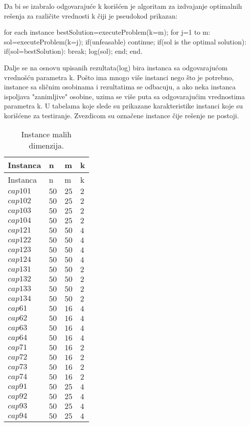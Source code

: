 \documentclass[a4paper]{article}
\begin{document}
Da bi se izabralo odgovarajuće k korišćen je algoritam za izdvajanje optimalnih rešenja za različite vrednosti k čiji je pseudokod prikazan:
\begin{algorithm}
for each instance
	bestSolution=executeProblem(k=m);
	for j=1 to m:
		sol=executeProblem(k=j);
		if(unfeasable)
			continue;
		if(sol is the optimal solution):
			if(sol=bestSolution):
				break;
			log(sol);
	end;
end.
\end{algorithm}

Dalje se na osnovu upisanih rezultata(log) bira instanca sa odgovarajućom vrednošću parametra k. Pošto ima mnogo više instanci nego što je potrebno, instance sa sličnim osobinama i rezultatima se odbacuju, a ako neka instanca ispoljava "zanimljive" osobine, uzima se više puta sa odgovarajućim vrednostima parametra k. U tabelama koje slede su prikazane karakteristike instanci koje su korišćene za testiranje. Zvezdicom su označene instance čije rešenje ne postoji.


\begin{longtabu} to 1\textwidth{ X[2] | X  X  X }\caption{Instance malih dimenzija.\label{instancetable}}\\ Instanca & n & m &k \\\hline\endfirsthead\endfoot Instanca & n & m &k \\\hline\endhead\hline\endlastfoot $cap101$& $50$ & $25$ & $2$\\ 
$cap102$& $50$ & $25$ & $2$\\ 
$cap103$& $50$ & $25$ & $2$\\ 
$cap104$& $50$ & $25$ & $2$\\ 
$cap121$& $50$ & $50$ & $4$\\ 
$cap122$& $50$ & $50$ & $4$\\ 
$cap123$& $50$ & $50$ & $4$\\ 
$cap124$& $50$ & $50$ & $4$\\ 
$cap131$& $50$ & $50$ & $2$\\ 
$cap132$& $50$ & $50$ & $2$\\ 
$cap133$& $50$ & $50$ & $2$\\ 
$cap134$& $50$ & $50$ & $2$\\ 
$cap61$& $50$ & $16$ & $4$\\ 
$cap62$& $50$ & $16$ & $4$\\ 
$cap63$& $50$ & $16$ & $4$\\ 
$cap64$& $50$ & $16$ & $4$\\ 
$cap71$& $50$ & $16$ & $2$\\ 
$cap72$& $50$ & $16$ & $2$\\ 
$cap73$& $50$ & $16$ & $2$\\ 
$cap74$& $50$ & $16$ & $2$\\ 
$cap91$& $50$ & $25$ & $4$\\ 
$cap92$& $50$ & $25$ & $4$\\ 
$cap93$& $50$ & $25$ & $4$\\ 
$cap94$& $50$ & $25$ & $4$\\ 
\end{longtabu}
\end{document}
